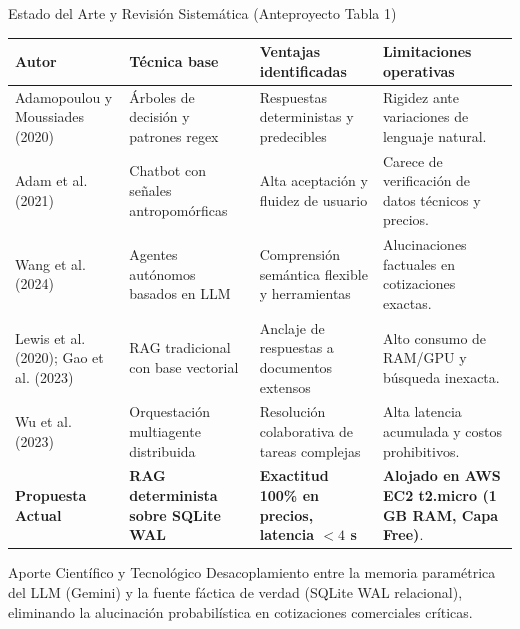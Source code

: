 \documentclass[aspectratio=169, 10pt]{beamer}
\begin{document}
\begin{frame}{Estado del Arte y Revisión Sistemática (Anteproyecto Tabla 1)}
  \setlength{\tabcolsep}{3.5pt}
  \begin{table}[H]
    \centering
    \tiny
    \begin{tabular}{>{\raggedright\arraybackslash}p{2.6cm} >{\raggedright\arraybackslash}p{2.8cm} >{\raggedright\arraybackslash}p{3.8cm} >{\raggedright\arraybackslash}p{4.2cm}}
      \toprule
      \textbf{Autor} & \textbf{Técnica base} & \textbf{Ventajas identificadas} & \textbf{Limitaciones operativas} \\
      \midrule
      Adamopoulou y Moussiades (2020) & Árboles de decisión y patrones regex & Respuestas deterministas y predecibles & Rigidez ante variaciones de lenguaje natural. \\
      \addlinespace
      Adam et al. (2021) & Chatbot con señales antropomórficas & Alta aceptación y fluidez de usuario & Carece de verificación de datos técnicos y precios. \\
      \addlinespace
      Wang et al. (2024) & Agentes autónomos basados en LLM & Comprensión semántica flexible y herramientas & Alucinaciones factuales en cotizaciones exactas. \\
      \addlinespace
      Lewis et al. (2020); Gao et al. (2023) & RAG tradicional con base vectorial & Anclaje de respuestas a documentos extensos & Alto consumo de RAM/GPU y búsqueda inexacta. \\
      \addlinespace
      Wu et al. (2023) & Orquestación multiagente distribuida & Resolución colaborativa de tareas complejas & Alta latencia acumulada y costos prohibitivos. \\
      \addlinespace
      \textbf{Propuesta Actual} & \textbf{RAG determinista sobre SQLite WAL} & \textbf{Exactitud 100\% en precios, latencia $< 4$ s} & \textbf{Alojado en AWS EC2 t2.micro (1 GB RAM, Capa Free)}. \\
      \bottomrule
    \end{tabular}
  \end{table}
  
  \vspace{0.05cm}
  \begin{block}{Aporte Científico y Tecnológico}
    \scriptsize
    Desacoplamiento entre la memoria paramétrica del LLM (Gemini) y la fuente fáctica de verdad (SQLite WAL relacional), eliminando la alucinación probabilística en cotizaciones comerciales críticas.
  \end{block}
\end{frame}
\end{document}
